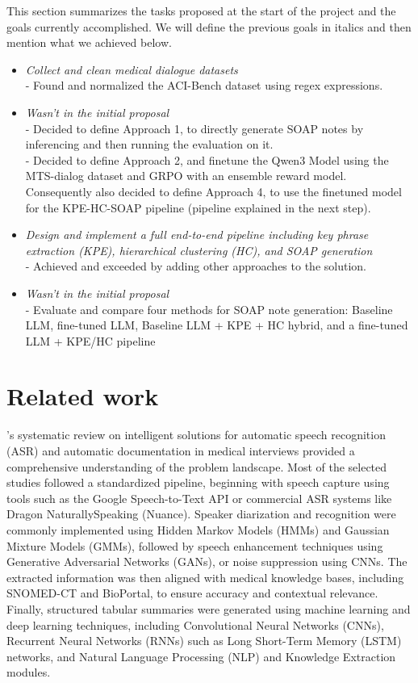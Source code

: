 \documentclass[11pt,a4paper]{article}
\begin{document}
This section summarizes the tasks proposed at the start of the project and the goals currently accomplished. We will define the previous goals in italics and then mention what we achieved below.
\begin{itemize}
\item \textit{Collect and clean medical dialogue
datasets}\\ - Found and normalized the ACI-Bench dataset using regex expressions.
\item \textit{Wasn't in the initial proposal}
\\ - Decided to define Approach 1, to directly generate SOAP notes by inferencing and then running the evaluation on it.
\\ - Decided to define Approach 2, and finetune the Qwen3 Model using the MTS-dialog dataset and GRPO with an ensemble reward model. Consequently also decided to define Approach 4, to use the finetuned model for the KPE-HC-SOAP pipeline (pipeline explained in the next step).
\item \textit{Design and implement a full end-to-end pipeline including key phrase extraction (KPE), hierarchical clustering (HC), and SOAP generation}
\\ -  Achieved and exceeded by adding other approaches to the solution.
\item \textit{Wasn't in the initial proposal}
\\ - Evaluate and compare four methods for SOAP note generation: Baseline LLM, fine-tuned LLM, Baseline LLM + KPE + HC hybrid, and a fine-tuned LLM + KPE/HC pipeline
\end{itemize}

\section{Related work}
\cite{SR}'s systematic review on intelligent solutions for automatic speech recognition (ASR) and automatic documentation in medical interviews provided a comprehensive understanding of the problem landscape. Most of the selected studies followed a standardized pipeline, beginning with speech capture using tools such as the Google Speech-to-Text API or commercial ASR systems like Dragon NaturallySpeaking (Nuance). Speaker diarization and recognition were commonly implemented using Hidden Markov Models (HMMs) and Gaussian Mixture Models (GMMs), followed by speech enhancement techniques using Generative Adversarial Networks (GANs), or noise suppression using CNNs. The extracted information was then aligned with medical knowledge bases, including SNOMED-CT and BioPortal, to ensure accuracy and contextual relevance. Finally, structured tabular summaries were generated using machine learning and deep learning techniques, including Convolutional Neural Networks (CNNs), Recurrent Neural Networks (RNNs) such as Long Short-Term Memory (LSTM) networks, and Natural Language Processing (NLP) and Knowledge Extraction modules.
\end{document}
